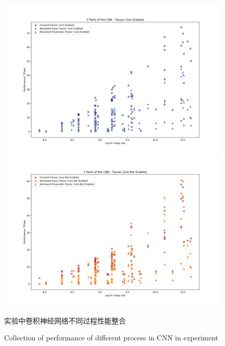 \begin{figure}
	\centering
	\includegraphics[width=15cm]{figures/CNN-HALF-3PART-TF.jpg}\\
	\includegraphics[width=15cm]{figures/CNN-HALF-3PART-NOTF.jpg}
	\renewcommand{\thefigure}{\arabic{section}-\arabic{figure} }
	\renewcommand{\figurename}{图}
	\caption{实验中卷积神经网络不同过程性能整合}
	\addtocounter{figure}{-1}
	\renewcommand{\thefigure}{\arabic{section}-\arabic{figure} }
	\renewcommand{\figurename}{Figure}
	\caption{Collection of performance of different process in CNN in experiment}
	\label{Fig.CNNPerf3Part}
\end{figure}
